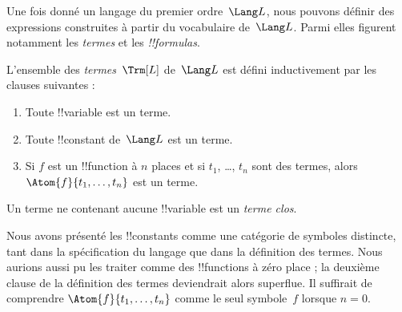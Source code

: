 \documentclass[../../../include/open-logic-section]{subfiles}
\begin{document}


Une fois donné un langage du premier ordre~$\Lang L$, nous pouvons
définir des expressions construites à partir du vocabulaire de~$\Lang L$.
Parmi elles figurent notamment les \emph{termes} et les
\emph{!!{formula}s}.

\begin{defn}[Termes]
L'ensemble des \emph{termes}~$\Trm[L]$ de~$\Lang L$ est défini
inductivement par les clauses suivantes :
\begin{enumerate}
\item Toute !!{variable} est un terme.
\item Toute !!{constant} de~$\Lang L$ est un terme.
\item Si $f$ est un !!{function} à $n$ places et si $t_1$, \dots,
  $t_n$ sont des termes, alors $\Atom{f}{t_1, \ldots, t_n}$ est un
  terme.
\end{enumerate}
Un terme ne contenant aucune !!{variable} est un \emph{terme clos}.
\end{defn}

\begin{explain}
Nous avons présenté les !!{constant}s comme une catégorie de symboles
distincte, tant dans la spécification du langage que dans la
définition des termes. Nous aurions aussi pu les traiter comme des
!!{function}s à zéro place ; la deuxième clause de la définition
des termes deviendrait alors superflue. Il suffirait de comprendre
$\Atom{f}{t_1, \ldots, t_n}$ comme le seul symbole~$f$ lorsque
$n = 0$.
\end{explain}
\end{document}
